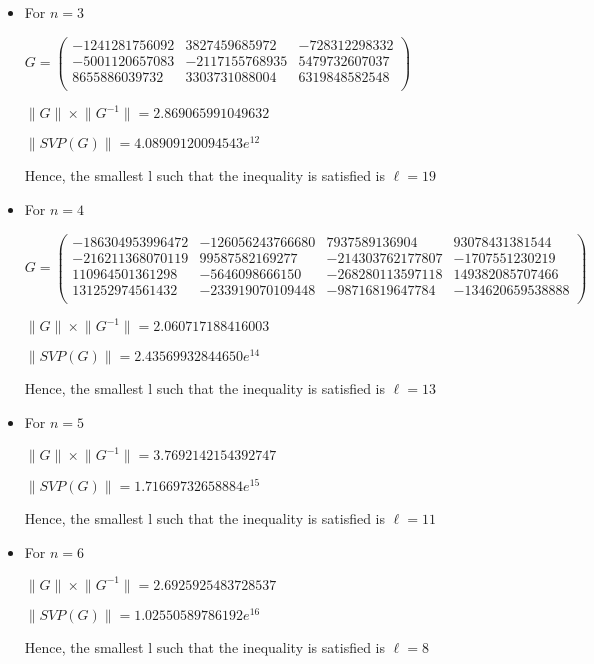 \documentclass[preprint]{iacrtrans}
\begin{document}
\begin{itemize}
	\item For \(n=3\)
	
	\(G = \begin{pmatrix}
	-1241281756092&3827459685972&-728312298332\\
	-5001120657083&-2117155768935&5479732607037\\
	8655886039732&3303731088004&6319848582548\\
	\end{pmatrix}\)
	
	\(\lVert G \rVert \times \lVert G^{-1} \rVert = 2.869065991049632\)
	
	\(\lVert SVP(G) \rVert = 4.08909120094543e{^12}\)
	
	Hence, the smallest l such that the inequality is satisfied is \(\ell = 19\) %
	
	\item For \(n=4\)
	
	\(G = \begin{pmatrix}
	-186304953996472&-126056243766680&7937589136904&93078431381544\\
	-216211368070119&99587582169277&-214303762177807&-1707551230219\\
	110964501361298&-5646098666150&-268280113597118&149382085707466\\
	131252974561432&-233919070109448&-98716819647784&-134620659538888\\
	\end{pmatrix}\)
	
	\(\lVert G \rVert \times \lVert G^{-1} \rVert = 2.060717188416003\)
	
	\(\lVert SVP(G) \rVert = 2.43569932844650e^{14}\)
	
	Hence, the smallest l such that the inequality is satisfied is \(\ell = 13\) %
	
	\item For \(n=5\)
	
	\(\lVert G \rVert \times \lVert G^{-1} \rVert = 3.7692142154392747\)
	
	\(\lVert SVP(G) \rVert = 1.71669732658884e^{15}\)
	
	Hence, the smallest l such that the inequality is satisfied is \(\ell = 11\)  %
	
	\item For \(n=6\)
	
	\(\lVert G \rVert \times \lVert G^{-1} \rVert = 2.6925925483728537\)
	
	\(\lVert SVP(G) \rVert =1.02550589786192e^{16}\)
	
	Hence, the smallest l such that the inequality is satisfied is \(\ell = 8\) %
\end{itemize}
\end{document}
